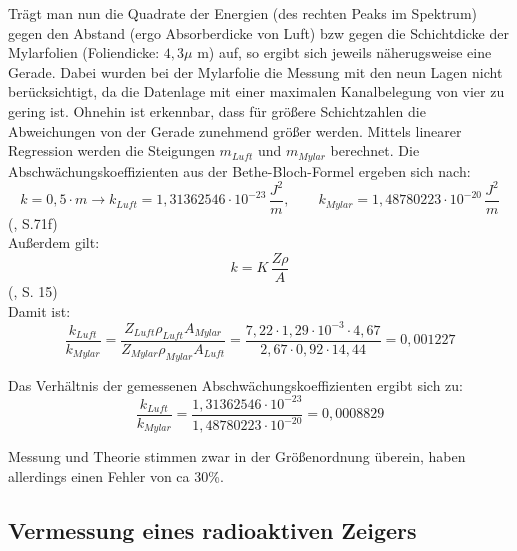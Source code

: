 Trägt man nun die Quadrate der Energien (des rechten Peaks im Spektrum) gegen den Abstand (ergo Absorberdicke von Luft) bzw 
gegen die Schichtdicke der Mylarfolien (Foliendicke: $4,3 \mu$ m) auf, so ergibt sich jeweils näherugsweise eine Gerade. Dabei wurden 
bei der Mylarfolie die Messung mit den neun Lagen nicht berücksichtigt, da die Datenlage mit einer maximalen Kanalbelegung von vier zu 
gering ist. Ohnehin ist erkennbar, dass für größere Schichtzahlen die Abweichungen von der Gerade zunehmend größer werden. Mittels 
linearer Regression werden die Steigungen $m_{Luft}$ und $m_{Mylar}$ berechnet. Die Abschwächungskoeffizienten aus der 
Bethe-Bloch-Formel ergeben sich nach: \\

\begin{equation}
    k = 0,5 \cdot m
    \to k_{Luft} = 1,31362546 \cdot 10^{-23} \, \frac{J^2}{m}, \qquad k_{Mylar} = 1,48780223 \cdot 10^{-20} \, \frac{J^2}{m}
\end{equation}
(\cite{Jaekel1997}, S.71f) \\

Außerdem gilt: \\

\begin{equation}
    k = K \, \frac{Z \rho}{A}
\end{equation}
(\cite{Kador2021}, S. 15) \\

Damit ist: \\

\begin{equation}
    \frac{k_{Luft}}{k_{Mylar}} = \frac{Z_{Luft} \rho_{Luft} A_{Mylar}}{Z_{Mylar} \rho_{Mylar} A_{Luft}} = 
    \frac{7,22 \cdot 1,29 \cdot 10^{-3} \cdot 4,67}{2,67 \cdot 0,92 \cdot 14,44} = 0,001227
\end{equation}
 
Das Verhältnis der gemessenen Abschwächungskoeffizienten ergibt sich zu:\\

\begin{equation}
    \frac{k_{Luft}}{k_{Mylar}} = \frac{1,31362546 \cdot 10^{-23}}{1,48780223 \cdot 10^{-20}} = 0,0008829
\end{equation}

Messung und Theorie stimmen zwar in der Größenordnung überein, haben allerdings einen Fehler von ca 30\%. 

\subsection{Vermessung eines radioaktiven Zeigers}


